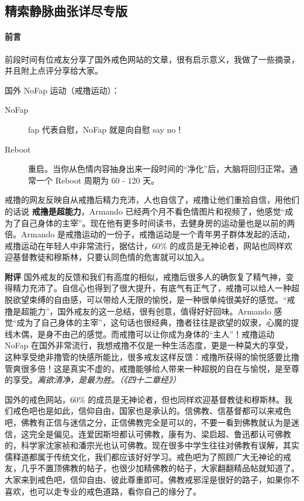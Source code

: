 \subsection{精索静脉曲张详尽专版}

\paragraph*{前言}

前段时间有位戒友分享了国外戒色网站的文章，很有启示意义，我做了一些摘录，并且附上点评分享给大家。

国外 NoFap 运动（戒撸运动）：

\begin{description}
    \item[NoFap] fap 代表自慰，NoFap 就是向自慰 say no！
    \item[Reboot] 重启。当你从色情内容抽身出来一段时间的“净化”后，大脑将回归正常。通常一个 Reboot 周期为 60 - 120 天。
\end{description}

\begin{case}[国外戒色网站摘录]
    戒撸的网友反映自从戒撸后精力充沛，人也自信了，戒撸让他们重拾自信，用他们的话说 \textbf{戒撸是超能力}，Armando 已经两个月不看色情图片和视频了，他感觉“成为了自己身体的主宰”。现在他有更多时间读书，去健身房的运动量也是以前的两倍。Armando 是戒撸运动的一份子，戒撸运动是一个青年男子群体发起的活动，戒撸运动在年轻人中非常流行，据估计，60\% 的成员是无神论者，网站也同样欢迎基督教徒和穆斯林，只要认同色情的危害就可以加入。

    \textbf{附评} 国外戒友的反馈和我们有高度的相似，戒撸后很多人的确恢复了精气神，变得精力充沛了。自信心也得到了很大提升，有底气有正气了，戒撸可以给人一种超脱欲望束缚的自由感，可以带给人无限的愉悦，是一种很单纯很美好的感觉。“戒撸是超能力”，国外戒友的这一总结，很有创意，值得好好回味。Armando 感觉“成为了自己身体的主宰”，这句话也很经典，撸者往往是欲望的奴隶，心魔的提线木偶，是身不由己的感觉。而戒撸可以让你成为身体的“主人”！戒撸运动 NoFap 在国外非常流行，我想戒撸不仅是一种生活态度，更是一种莫大的享受，这种享受绝非撸管的快感所能比，很多戒友这样反馈：戒撸所获得的愉悦感要比撸管爽很多倍！这是真实不虚的，戒撸能够给人带来一种超脱的自在与愉悦，是至尊的享受。\textit{离欲清净，是最为胜。（《四十二章经》）}

    国外的戒色网站，60\% 的成员是无神论者，但也同样欢迎基督教徒和穆斯林。我们戒色吧也是如此，信仰自由，国家也是承认的。信佛教、信基督都可以来戒色吧，佛教有正信与迷信之分，正信佛教完全是可以的，不要一看到佛教就认为是迷信，这完全是偏见。连爱因斯坦都认可佛教，康有为、梁启超、鲁迅都认可佛教的，科学家沈家祯和潘宗光也认可佛教。现在很多中学生往往对佛教有误解，其实儒释道都属于传统文化，我们都应该好好学习。戒色吧为了照顾广大无神论的戒友，几乎不置顶佛教的帖子，也很少加精佛教的帖子，大家翻翻精品帖就知道了。大家来到戒色吧，信仰自由、彼此尊重即可。佛教戒邪淫是很好的路子，如果你不喜欢，也可以走专业的戒色道路，看你自己的缘分了。
\end{case}

